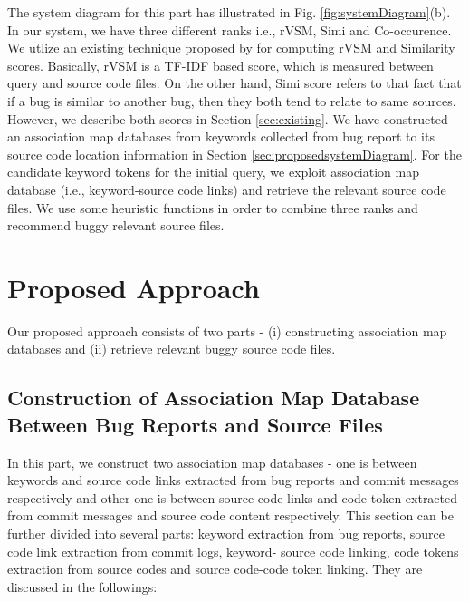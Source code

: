 \documentclass[conference]{IEEEtran}
\begin{document}
The system diagram for this part has illustrated in Fig. \ref{fig:systemDiagram}(b).
In our system, we have three different ranks i.e., rVSM, Simi and Co-occurence. We utlize an existing technique proposed by \citet{Jian} for computing rVSM and Similarity scores. Basically, rVSM is a TF-IDF based score, which is measured between query and source code files.
On the other hand, Simi score refers to that fact that if a bug is similar to another bug, then they both tend to relate to same sources. However, we describe both scores in Section \ref{sec:existing}.
We have constructed an association map databases from keywords collected from bug report to its source code location information in Section \ref{sec:proposedsystemDiagram}.
For the candidate keyword tokens for the initial query, we exploit association map database (i.e., keyword-source code links) and retrieve the relevant source code files. We use some heuristic functions in order to combine three ranks and recommend buggy relevant source files. 


\section{Proposed Approach}\label{sec:proposedApproach}
Our proposed approach consists of two parts - (i) constructing association map databases and (ii) retrieve relevant buggy source code files. 

\subsection{Construction of Association Map Database Between Bug Reports and Source Files}
In this part, we construct two association map databases - one is between keywords and source code links extracted from bug reports and commit messages respectively and other one is between source code links and code token extracted from commit messages and source code content respectively. This section can be further divided into several parts: keyword extraction from bug reports, source code link extraction from commit logs, keyword- source code linking, code tokens extraction from source codes and source code-code token linking. They are discussed in the followings:
\end{document}
